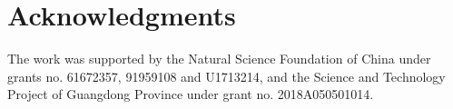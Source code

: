 \documentclass[10pt,twocolumn,letterpaper]{article}
\begin{document}

\section*{Acknowledgments}
The work was supported by the Natural Science Foundation of China under grants no. 61672357, 91959108 and U1713214,
and the Science and Technology Project of Guangdong Province under grant no. 2018A050501014.

{\small


}


\clearpage

\end{document}
